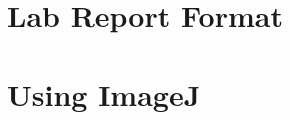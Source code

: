 \documentclass[]{msulabm}
\begin{document}
%
%
%
%
%
%
%
%
%
%
%
%
%

%
%
%
%
%
%
%
%
%
%
%
%
%
%
%
%
%
%
%
%
%
%
%
%
%
% 
% 
% 
% 
% 
% 
% 
% 
% 
% 

% 
% 
% 

\appendix


\chapter{Lab Report Format}



\chapter{Using ImageJ}
% 
% 
% 
% 
%
%
%
%
%
%
%
% 

% 
% 
\printbibliography
\end{document}
